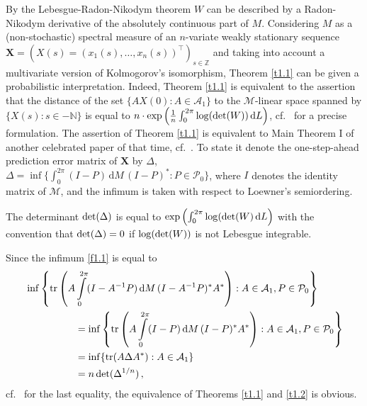 \documentclass{amsart}
\begin{document}
By the Lebesgue-Radon-Nikodym theorem $W$ can be described by a Radon-Nikodym derivative of the absolutely continuous part of $M$.
Considering $M$ as a (non-stochastic) spectral measure of an $n$-variate weakly stationary sequence ${\mathbf X}=(X(s) = (x_1(s), \ldots , x_n(s))^\top )_{s \in \mathbb Z}$ and taking into account a multivariate version of Kolmogorov's isomorphism, Theorem \ref{t1.1} can be given a probabilistic interpretation. Indeed, Theorem \ref{t1.1} is equivalent to the assertion that the distance of the set $\{ AX(0) : A \in {\mathcal A}_1 \}$ to the $\mathcal M$-linear space spanned by $\{ X(s): s \in -{\mathbb N} \}$ is equal to $n \cdot {\rm exp} \left( \frac{1}{n} \int_{0}^{2 \pi} {\rm log} ({\rm det} (W))\, {\mathrm d}  L \right)$, cf.~\cite[Thm.~11]{HL} for a precise formulation. The assertion of Theorem \ref{t1.1} is equivalent to Main Theorem I of another celebrated paper of that time, cf.~\cite [Subsection 7.10]{WM}. To state it denote the one-step-ahead prediction error matrix of $\mathbf X$ by $\Delta$, $\Delta = \inf \{ \int_{0}^{2 \pi} (I-P) \, {\mathrm d} M \, (I-P)^* : P \in {\mathcal P}_0 \}$, where $I$ denotes the identity matrix of $\mathcal M$, and the infimum is taken with respect to Loewner's semiordering. 

\begin{thm}   {\rm \cite [Subsection 7.10]{WM}}  \label{t1.2} \newline
   The determinant ${\rm det} (\Delta)$ is equal to ${\rm exp} \left(\int_{0}^{2 \pi} {\rm log} ( {\rm det} (W)  \, {\mathrm d} L\right)$ with the convention that ${\rm det}(\Delta)=0$ if ${\rm log}({\rm det}(W))$ is not Lebesgue integrable.
\end{thm}

Since the infimum \eqref{f1.1} is equal to 
\begin{eqnarray*}
\begin{split}
&\inf \left\{ {\rm tr} \left(A \int\limits_{0}^{2 \pi}  (I-A^{-1}P) \, {\mathrm d}M \, (I-A^{-1}P)^*A^*\right) : A \in {\mathcal A}_1, P \in {\mathcal P}_0 \right\} \\
& \quad \quad \quad \quad \quad =  \inf \left\{ {\rm tr} \left(A \int\limits_{0}^{2 \pi}  (I-P) \, {\mathrm d}M \, (I-P)^*A^*\right) : A \in {\mathcal A}_1, P \in {\mathcal P}_0 \right\} \\
& \quad \quad \quad \quad \quad = \inf \{ {\rm tr} (A \Delta A^*) : A \in {\mathcal A}_1 \} \\
& \quad \quad \quad \quad \quad = n \, {\rm det}(\Delta^{1/n}) \, ,
\end{split}
\end{eqnarray*}
cf.~\cite[Thm.~7.8.1]{HJ} for the last equality, the equivalence of Theorems \ref{t1.1} and \ref{t1.2} is obvious. 
\end{document}
